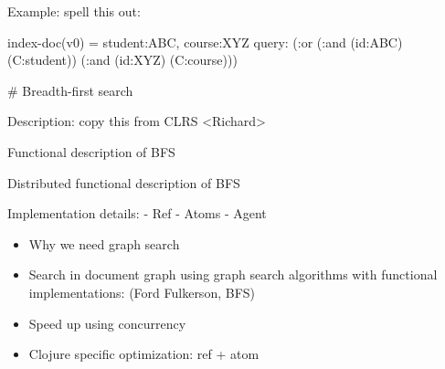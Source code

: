 		Example: spell this out:
		
		index-doc(v0) = student:ABC, course:XYZ
		query: (:or (:and (id:ABC) (C:student)) 
		(:and (id:XYZ) (C:course)))
		
		# Breadth-first search
		
		Description: copy this from CLRS
		<Richard>
		
		Functional description of BFS
		
		Distributed functional description of BFS
		
		Implementation details:
		- Ref
		- Atoms
		- Agent
		
		\begin{itemize}
			\item Why we need graph search
			\item Search in document graph using graph search algorithms with functional implementations: (Ford Fulkerson, BFS)
			\item Speed up using concurrency
			\item Clojure specific optimization: ref + atom
		\end{itemize}